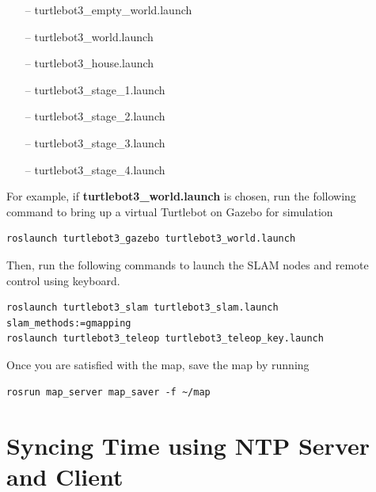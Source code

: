 \documentclass[12]{article}
\begin{document}
\begin{itemize}
    \item[--] turtlebot3\_empty\_world.launch
    \item[--] turtlebot3\_world.launch
    \item[--] turtlebot3\_house.launch
    \item[--] turtlebot3\_stage\_1.launch
    \item[--] turtlebot3\_stage\_2.launch
    \item[--] turtlebot3\_stage\_3.launch 
    \item[--] turtlebot3\_stage\_4.launch
\end {itemize}
For example, if \textbf{turtlebot3\_world.launch} is chosen, run the following command to bring up a virtual Turtlebot on Gazebo for simulation
\begin{lstlisting}[style=bash]
roslaunch turtlebot3_gazebo turtlebot3_world.launch
\end{lstlisting}
\newpage
Then, run the following commands to launch the SLAM nodes and remote control using keyboard. 
\begin{lstlisting}[style=bash]
roslaunch turtlebot3_slam turtlebot3_slam.launch slam_methods:=gmapping
roslaunch turtlebot3_teleop turtlebot3_teleop_key.launch
\end{lstlisting}
Once you are satisfied with the map, save the map by running
\begin{lstlisting}[style=bash]
rosrun map_server map_saver -f ~/map
\end{lstlisting}

\section{Syncing Time using NTP Server and Client}
\end{document}
